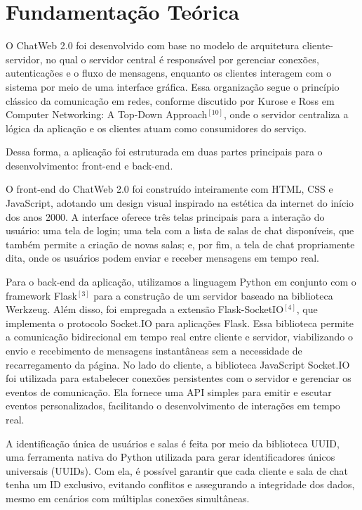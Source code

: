 \documentclass[conference,compsoc]{IEEEtran}
\begin{document}
\begin{otherlanguage}{brazil}
\section{Fundamentação Teórica}

O ChatWeb 2.0 foi desenvolvido com base no modelo de arquitetura cliente-servidor, no qual o servidor central é responsável por gerenciar conexões, autenticações e o fluxo de mensagens, enquanto os clientes interagem com o sistema por meio de uma interface gráfica. Essa organização segue o princípio clássico da comunicação em redes, conforme discutido por Kurose e Ross em Computer Networking: A Top-Down Approach$^{[10]}$, onde o servidor centraliza a lógica da aplicação e os clientes atuam como consumidores do serviço.

Dessa forma, a aplicação foi estruturada em duas partes principais para o desenvolvimento: front-end e back-end.

O front-end do ChatWeb 2.0 foi construído inteiramente com HTML, CSS e JavaScript, adotando um design visual inspirado na estética da internet do início dos anos 2000. A interface oferece três telas principais para a interação do usuário: uma tela de login; uma tela com a lista de salas de chat disponíveis, que também permite a criação de novas salas; e, por fim, a tela de chat propriamente dita, onde os usuários podem enviar e receber mensagens em tempo real.

Para o back-end da aplicação, utilizamos a linguagem Python em conjunto com o framework Flask$^{[3]}$ para a construção de um servidor baseado na biblioteca Werkzeug. Além disso, foi empregada a extensão Flask-SocketIO$^{[4]}$, que implementa o protocolo Socket.IO para aplicações Flask. Essa biblioteca permite a comunicação bidirecional em tempo real entre cliente e servidor, viabilizando o envio e recebimento de mensagens instantâneas sem a necessidade de recarregamento da página. No lado do cliente, a biblioteca JavaScript Socket.IO foi utilizada para estabelecer conexões persistentes com o servidor e gerenciar os eventos de comunicação. Ela fornece uma API simples para emitir e escutar eventos personalizados, facilitando o desenvolvimento de interações em tempo real.

A identificação única de usuários e salas é feita por meio da biblioteca UUID, uma ferramenta nativa do Python utilizada para gerar identificadores únicos universais (UUIDs). Com ela, é possível garantir que cada cliente e sala de chat tenha um ID exclusivo, evitando conflitos e assegurando a integridade dos dados, mesmo em cenários com múltiplas conexões simultâneas.


\end{otherlanguage}
\end{document}
